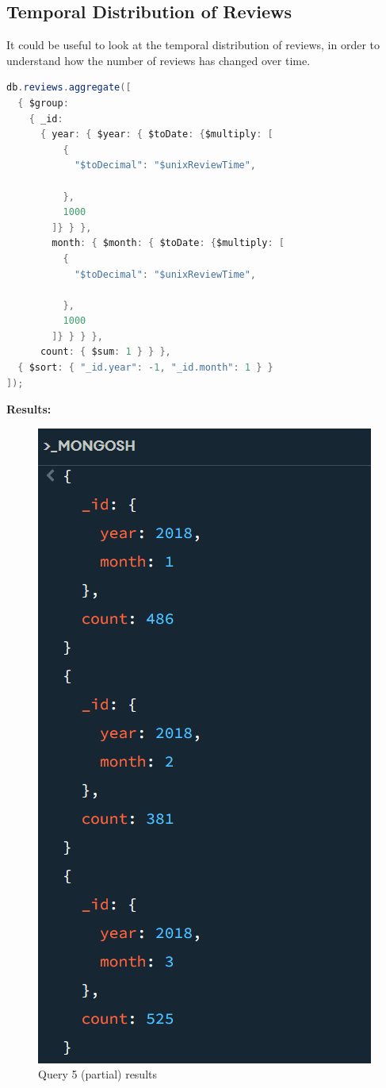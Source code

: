 \subsection{Temporal Distribution of Reviews}
It could be useful to look at the temporal distribution of reviews, in order to understand how the number of reviews has changed over time. \\
\begin{lstlisting}[language=Java]
db.reviews.aggregate([
  { $group: 
    { _id: 
      { year: { $year: { $toDate: {$multiply: [
          {
            "$toDecimal": "$unixReviewTime",
            
          },
          1000
        ]} } }, 
        month: { $month: { $toDate: {$multiply: [
          {
            "$toDecimal": "$unixReviewTime",
            
          },
          1000
        ]} } } }, 
      count: { $sum: 1 } } },
  { $sort: { "_id.year": -1, "_id.month": 1 } }
]);
\end{lstlisting}
\textbf{Results:}
\begin{figure}[H]
  \centering
  \includegraphics[scale=0.45]{Images/q5_result.png}
  \caption{Query 5 (partial) results}
  \label{fig:q5_result}
\end{figure}
